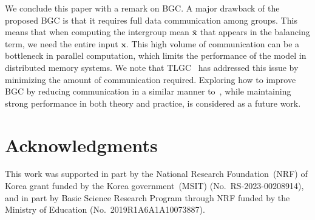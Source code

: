 \documentclass[preprint,12pt,authoryear]{elsarticle}
\numberwithin{equation}{section}
\theoremstyle{remark}
\newcommand\bx{\mathbf{x}}
\begin{document}
We conclude this paper with a remark on BGC.
A major drawback of the proposed BGC is that it requires full data communication among groups.
This means that when computing the intergroup mean $\bar{\bx}$ that appears in the balancing term, we need the entire input $\bx$.
This high volume of communication can be a bottleneck in parallel computation, which limits the performance of the model in distributed memory systems.
We note that TLGC~\citep{lee2022two} has addressed this issue by minimizing the amount of communication required.
Exploring how to improve BGC by reducing communication in a similar manner to~\citep{lee2022two}, while maintaining strong performance in both theory and practice, is considered as a future work.

\section*{Acknowledgments}
This work was supported in part by the National Research Foundation~(NRF) of Korea grant funded by the Korea government~(MSIT) (No.~RS-2023-00208914),
and in part by Basic Science Research Program through NRF funded by the Ministry of Education (No.~2019R1A6A1A10073887).



 






\end{document}
